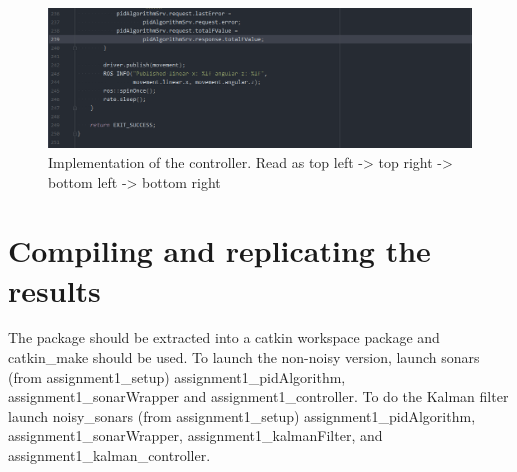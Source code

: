 \documentclass{article}
\begin{document}
\newpage
\begin{figure}[ht]
    \centering
    \includegraphics[scale=0.24]{img/controller5.png}
    \caption{Implementation of the controller. Read as top left -> top right -> 
    bottom left -> bottom right}
    \label{controllerImplement}
\end{figure}
\section{Compiling and replicating the results}
The package should be extracted into a catkin workspace package and catkin\_make
should be used. To launch the non-noisy version, launch sonars (from
assignment1\_setup) assignment1\_pidAlgorithm, assignment1\_sonarWrapper and 
assignment1\_controller. To do the Kalman filter launch noisy\_sonars (from
assignment1\_setup) assignment1\_pidAlgorithm, assignment1\_sonarWrapper,
assignment1\_kalmanFilter, and assignment1\_kalman\_controller. 
\newpage


\end{document}
